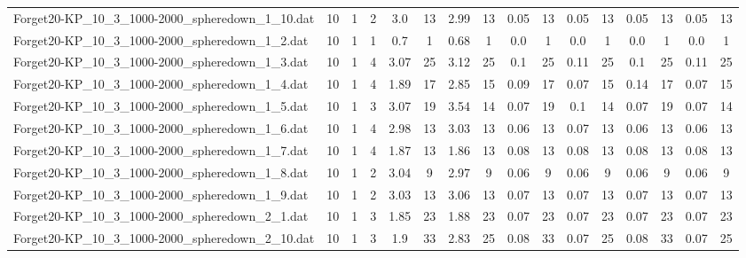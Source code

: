 \begin{sidewaystable}[!ht]
{\begin{tabular}{lccccccccccccccc}
Forget20-KP\_10\_3\_1000-2000\_spheredown\_1\_10.dat & 10 & 1 & 2 & 3.0 & 13 & 2.99 & 13 &  \textcolor{blue2}{0.05} & 13 &  \textcolor{blue2}{0.05} & 13 &  \textcolor{blue2}{0.05} & 13 &  \textcolor{blue2}{0.05} & 13 \\
Forget20-KP\_10\_3\_1000-2000\_spheredown\_1\_2.dat & 10 & 1 & 1 & 0.7 & 1 & 0.68 & 1 &  \textcolor{blue2}{0.0} & 1 &  \textcolor{blue2}{0.0} & 1 &  \textcolor{blue2}{0.0} & 1 &  \textcolor{blue2}{0.0} & 1 \\
Forget20-KP\_10\_3\_1000-2000\_spheredown\_1\_3.dat & 10 & 1 & 4 & 3.07 & 25 & 3.12 & 25 &  \textcolor{blue2}{0.1} & 25 & 0.11 & 25 &  \textcolor{blue2}{0.1} & 25 & 0.11 & 25 \\
Forget20-KP\_10\_3\_1000-2000\_spheredown\_1\_4.dat & 10 & 1 & 4 & 1.89 & 17 & 2.85 & 15 & 0.09 & 17 &  \textcolor{blue2}{0.07} & 15 & 0.14 & 17 &  \textcolor{blue2}{0.07} & 15 \\
Forget20-KP\_10\_3\_1000-2000\_spheredown\_1\_5.dat & 10 & 1 & 3 & 3.07 & 19 & 3.54 & 14 &  \textcolor{blue2}{0.07} & 19 & 0.1 & 14 &  \textcolor{blue2}{0.07} & 19 &  \textcolor{blue2}{0.07} & 14 \\
Forget20-KP\_10\_3\_1000-2000\_spheredown\_1\_6.dat & 10 & 1 & 4 & 2.98 & 13 & 3.03 & 13 &  \textcolor{blue2}{0.06} & 13 & 0.07 & 13 &  \textcolor{blue2}{0.06} & 13 &  \textcolor{blue2}{0.06} & 13 \\
Forget20-KP\_10\_3\_1000-2000\_spheredown\_1\_7.dat & 10 & 1 & 4 & 1.87 & 13 & 1.86 & 13 &  \textcolor{blue2}{0.08} & 13 &  \textcolor{blue2}{0.08} & 13 &  \textcolor{blue2}{0.08} & 13 &  \textcolor{blue2}{0.08} & 13 \\
Forget20-KP\_10\_3\_1000-2000\_spheredown\_1\_8.dat & 10 & 1 & 2 & 3.04 & 9 & 2.97 & 9 &  \textcolor{blue2}{0.06} & 9 &  \textcolor{blue2}{0.06} & 9 &  \textcolor{blue2}{0.06} & 9 &  \textcolor{blue2}{0.06} & 9 \\
Forget20-KP\_10\_3\_1000-2000\_spheredown\_1\_9.dat & 10 & 1 & 2 & 3.03 & 13 & 3.06 & 13 &  \textcolor{blue2}{0.07} & 13 &  \textcolor{blue2}{0.07} & 13 &  \textcolor{blue2}{0.07} & 13 &  \textcolor{blue2}{0.07} & 13 \\
Forget20-KP\_10\_3\_1000-2000\_spheredown\_2\_1.dat & 10 & 1 & 3 & 1.85 & 23 & 1.88 & 23 &  \textcolor{blue2}{0.07} & 23 &  \textcolor{blue2}{0.07} & 23 &  \textcolor{blue2}{0.07} & 23 &  \textcolor{blue2}{0.07} & 23 \\
Forget20-KP\_10\_3\_1000-2000\_spheredown\_2\_10.dat & 10 & 1 & 3 & 1.9 & 33 & 2.83 & 25 & 0.08 & 33 &  \textcolor{blue2}{0.07} & 25 & 0.08 & 33 &  \textcolor{blue2}{0.07} & 25 \\

\end{tabular}}
\end{sidewaystable}
